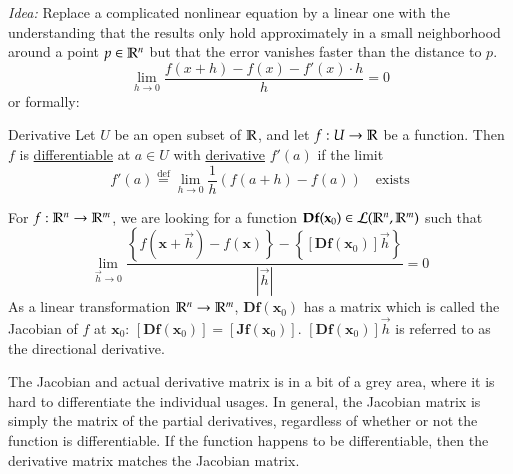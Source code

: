 \textit{Idea:} Replace a complicated nonlinear equation by a linear one with the understanding that the results only hold approximately in a small neighborhood around a point $p\in \mathbb{R}^n$ but that the error vanishes faster than the distance to $p$.
\[\lim_{h\rightarrow 0} \frac{f(x+h)-f(x)-f'(x)\cdot h}{h}=0\]
or formally: 
\begin{defn}{Derivative}
	Let $U$ be an open subset of $\mathbb{R}$, and let $f : U\to \mathbb{R}$ be a function. Then $f$ is \ul{differentiable} at $a\in U$ with \ul{derivative} $f'(a)$ if the limit
\[f'(a)\overset{\mathrm{def}}{=}\lim_{h\rightarrow 0}\frac{1}{h}\left(f(a+h)-f(a)\right)\quad \text{exists}\]
\end{defn}
For $f : \mathbb{R}^n \rightarrow \mathbb{R}^m$, we are looking for a function $\textbf{Df}(\textbf{x}_0)\in \mathcal{L}(\mathbb{R}^n,\mathbb{R}^m)$ such that
\[\lim_{\vec{h}\rightarrow 0} \frac{\left\{f(\bm{x}+\vec{h})-f(\bm{x})\right\}-\left\{[\bm{Df}(\bm{x}_0)]\vec{h}\right\}}{|\vec{h}|}=0\]
As a linear transformation $\mathbb{R}^n\rightarrow \mathbb{R}^m$, $\bm{Df}(\bm{x}_0)$ has a matrix which is called the Jacobian of $f$ at $\bm{x}_0$: $[\bm{Df}(\bm{x}_0)]=[\bm{Jf}(\bm{x}_{0})]$. $[\bm{Df}(\bm{x}_0)]\vec{h}$ is referred to as the directional derivative. 

The Jacobian and actual derivative matrix is in a bit of a grey area, where it is hard to differentiate the individual usages. In general, the Jacobian matrix is simply the matrix of the partial derivatives, regardless of whether or not the function is differentiable. If the function happens to be differentiable, then the derivative matrix matches the Jacobian matrix. 
